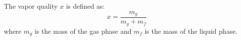 The vapor quality \(x\) is defined as:  
\[
x = \frac{m_g}{m_g + m_f}
\]  
where \( m_g \) is the mass of the gas phase and \( m_f \) is the mass of the liquid phase.